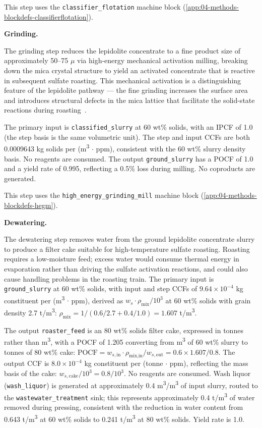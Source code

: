 This step uses the \texttt{classifier\_flotation} machine block (\ref{app:04-methods-blockdefs-classifierflotation}).

\medskip
\noindent\textbf{Grinding.}\quad

The grinding step reduces the lepidolite concentrate to a fine product size of approximately 50--75 $\mu$ via high-energy mechanical activation milling, breaking down the mica crystal structure to yield an activated concentrate that is reactive in subsequent sulfate roasting. This mechanical activation is a distinguishing feature of the lepidolite pathway --- the fine grinding increases the surface area and introduces structural defects in the mica lattice that facilitate the solid-state reactions during roasting~\citep{dengSystematicReviewSulfate2026, yanExtractionLithiumLepidolite2012}.

The primary input is \texttt{classified\_slurry} at 60 wt\% solids, with an IPCF of 1.0 (the step basis is the same volumetric unit). The step and input CCFs are both 0.0009643 kg solids per (m\textsuperscript{3} $\cdot$ ppm), consistent with the 60 wt\% slurry density basis. No reagents are consumed. The output \texttt{ground\_slurry} has a POCF of 1.0 and a yield rate of 0.995, reflecting a 0.5\% loss during milling. No coproducts are generated.

This step uses the \texttt{high\_energy\_grinding\_mill} machine block (\ref{app:04-methods-blockdefs-hegm}).

\medskip
\noindent\textbf{Dewatering.}\quad

The dewatering step removes water from the ground lepidolite concentrate slurry to produce a filter cake suitable for high-temperature sulfate roasting. Roasting requires a low-moisture feed; excess water would consume thermal energy in evaporation rather than driving the sulfate activation reactions, and could also cause handling problems in the roasting train. The primary input is \texttt{ground\_slurry} at 60 wt\% solids, with input and step CCFs of $9.64 \times 10^{-4}$ kg constituent per (m\textsuperscript{3} $\cdot$
ppm), derived as $w_s \cdot \rho_{\text{mix}} / 10^3$ at 60 wt\% solids with grain density 2.7 t/m\textsuperscript{3}: $\rho_{\text{mix}} = 1/(0.6/2.7 + 0.4/1.0) = 1.607$ t/m\textsuperscript{3}.

The output \texttt{roaster\_feed} is an 80 wt\% solids filter cake, expressed in tonnes rather than m\textsuperscript{3}, with a POCF of 1.205 converting from m\textsuperscript{3} of 60 wt\% slurry to tonnes of 80 wt\% cake: $\text{POCF} = w_{s,\text{in}} \cdot \rho_{\text{mix,in}} / w_{s,\text{out}} = 0.6 \times 1.607 / 0.8$. The output CCF is $8.0 \times 10^{-4}$ kg constituent per (tonne $\cdot$ ppm), reflecting the mass basis of the cake: $w_{s,\text{cake}} / 10^3 = 0.8 / 10^3$. No reagents are consumed. Wash liquor (\texttt{wash\_liquor}) is generated at approximately 0.4 m\textsuperscript{3}/m\textsuperscript{3} of input slurry, routed to the \texttt{wastewater\_treatment} sink; this represents approximately 0.4 t/m\textsuperscript{3} of water removed during pressing, consistent with the reduction in water content from 0.643 t/m\textsuperscript{3} at 60 wt\% solids to 0.241 t/m\textsuperscript{3} at 80 wt\% solids. Yield rate is 1.0.

